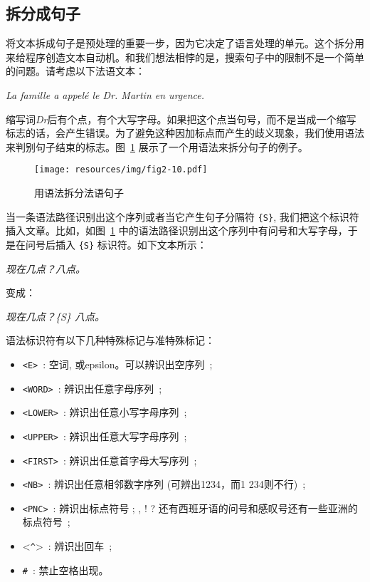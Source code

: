 \subsection{拆分成句子}
\label{section-sentence-splitting}
将文本拆成句子是预处理的重要一步，因为它决定了语言处理的单元。这个拆分用来给程序创造文本自动机。和我们想法相悖的是，搜索句子中的限制不是一个简单的问题。请考虑以下法语文本：


\bigskip
\textit{La famille a appelé le Dr. Martin en urgence.}

\bigskip \noindent  缩写词\textit{Dr}后有个点，有个大写字母。如果把这个点当句号，而不是当成一个缩写标志的话，会产生错误。为了避免这种因加标点而产生的歧义现象，我们使用语法来判别句子结束的标志。图~\ref{fig-example-sentence-splitting} 展示了一个用语法来拆分句子的例子。

\begin{figure}[!h]
\begin{center}
\texttt{[image: resources/img/fig2-10.pdf]}
\caption{用语法拆分法语句子
\label{fig-example-sentence-splitting}}
\end{center}
\end{figure}

\noindent  当一条语法路径识别出这个序列或者当它产生句子分隔符 \verb+{S}+,
我们把这个标识符插入文章。比如，如图~\ref{fig-example-sentence-splitting} 中的语法路径识别出这个序列中有问号和大写字母，于是在问号后插入
\verb+{S}+ 标识符。如下文本所示：


\bigskip
\textit{现在几点？八点。}

\bigskip
\noindent 变成：

\bigskip
\textit{现在几点？\{S\} 八点。}

\bigskip
\noindent 语法标识符有以下几种特殊标记与准特殊标记：

\index{\verb+<^>+}\index{\verb+#+}
\begin{itemize}
  \item \verb+<E>+~: 空词, 或epsilon。可以辨识出空序列~;
  \item \verb+<WORD>+~: 辨识出任意字母序列~;
  \item \verb+<LOWER>+~: 辨识出任意小写字母序列~;
  \item \verb+<UPPER>+~: 辨识出任意大写字母序列~;
  \item \verb+<FIRST>+~: 辨识出任意首字母大写序列~;
  \item \verb+<NB>+~: 辨识出任意相邻数字序列 (可辨出1234，而1 234则不行)~; 
  \item \verb+<PNC>+~: 辨识出标点符号 ; , ! ? 还有西班牙语的问号和感叹号还有一些亚洲的标点符号~;
  \item <\verb+^+>~: 辨识出回车~;
  \item \verb+#+~: 禁止空格出现。
\end{itemize}

